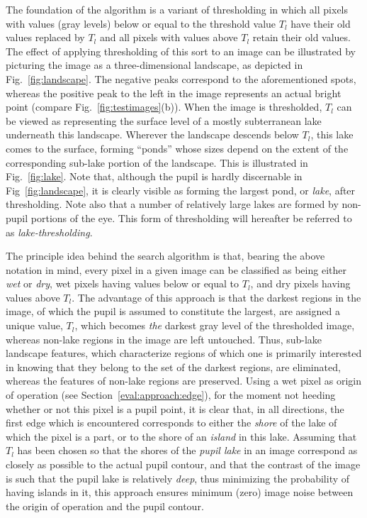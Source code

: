 The foundation of the algorithm is a variant of thresholding in which
all pixels with values (gray levels) below or equal to the threshold
value $T_{l}$ have their old values replaced by $T_{l}$ and all pixels
with values above $T_{l}$ retain their old values.  The effect of
applying thresholding of this sort to an image can be illustrated by
picturing the image as a three-dimensional landscape, as depicted in
Fig.~\ref{fig:landscape}.  The negative peaks correspond to the
aforementioned spots, whereas the positive peak to the left in the
image represents an actual bright point (compare
Fig.~\ref{fig:testimages}(b)).  When the image is thresholded, $T_{l}$
can be viewed as representing the surface level of a mostly
subterranean lake underneath this landscape.  Wherever the landscape
descends below $T_{l}$, this lake comes to the surface, forming
``ponds'' whose sizes depend on the extent of the corresponding
sub-lake portion of the landscape.  This is illustrated in
Fig.~\ref{fig:lake}.  Note that, although the pupil is hardly
discernable in Fig~\ref{fig:landscape}, it is clearly visible as
forming the largest pond, or {\em lake\/}, after thresholding.  Note
also that a number of relatively large lakes are formed by non-pupil
portions of the eye.  This form of thresholding will hereafter be
referred to as {\em lake-thresholding\/}.

The principle idea behind the search algorithm is that, bearing the
above notation in mind, every pixel in a given image can be classified
as being either {\em wet\/} or {\em dry\/}, wet pixels having values
below or equal to $T_{l}$, and dry pixels having values above $T_{l}$.
The advantage of this approach is that the darkest regions in the
image, of which the pupil is assumed to constitute the largest, are
assigned a unique value, $T_{l}$, which becomes {\em the\/} darkest
gray level of the thresholded image, whereas non-lake regions in the
image are left untouched.  Thus, sub-lake landscape features, which
characterize regions of which one is primarily interested in knowing
that they belong to the set of the darkest regions, are eliminated,
whereas the features of non-lake regions are preserved.  Using a wet
pixel as origin of operation (see Section~\ref{eval:approach:edge}),
for the moment not heeding whether or not this pixel is a pupil point,
it is clear that, in all directions, the first edge which is
encountered corresponds to either the {\em shore\/} of the lake of
which the pixel is a part, or to the shore of an {\em island\/} in
this lake.  Assuming that $T_{l}$ has been chosen so that the shores
of the {\em pupil lake\/} in an image correspond as closely as
possible to the actual pupil contour, and that the contrast of the
image is such that the pupil lake is relatively {\em deep\/}, thus
minimizing the probability of having islands in it, this approach
ensures minimum (zero) image noise between the origin of operation and
the pupil contour.

